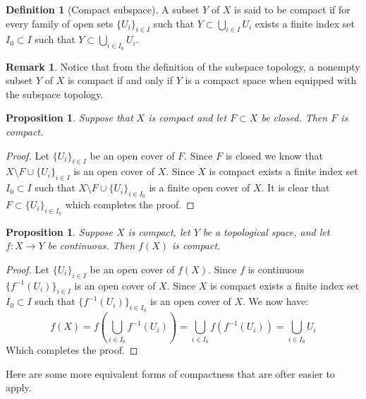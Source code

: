 \documentclass[11pt,a4paper]{article}
\theoremstyle{definition}
\newtheorem{definition}{Definition}[section]
\newtheorem{remark}{Remark}[section]
\theoremstyle{plain}
\newtheorem{proposition}[theorem]{Proposition}
\begin{document}
  \begin{definition}[Compact subspace]
    A subset $Y$ of $X$ is said to be compact if for every family of open
    sets $\{U_i\}_{i \in I}$ such that $Y \subset \bigcup_{i \in I} U_i$
    exists a finite index set $I_0 \subset I$ such that 
    $Y \subset \bigcup_{i \in I_0} U_i$.
  \end{definition}

  \begin{remark}
    Notice that from the definition of the subspace topology,
    a nonempty subset $Y$ of $X$ is compact if and only if $Y$ is a 
    compact space when equipped with the subspace topology.
  \end{remark}

  \begin{proposition}
    Suppose that $X$ is compact and let $F \subset X$ be closed. Then
    $F$ is compact.
  \end{proposition}
  \begin{proof}
    Let $\{U_i\}_{i \in I}$ be an open cover of $F$. Since $F$ is closed
    we know that $X \setminus F \cup \{U_i\}_{i \in I}$ is an open cover
    of $X$. Since $X$ is compact exists a finite index set $I_0 \subset I$
    such that $X \setminus F \cup \{U_i\}_{i \in I_0}$ is a finite
    open cover of $X$. It is clear that $F \subset \{U_i\}_{i \in I_0}$
    which completes the proof.
  \end{proof}

  \begin{proposition}
    Suppose $X$ is compact, let $Y$ be a topological space, and let
    $f \colon X \to Y$ be continuous. Then $f(X)$ is compact.
  \end{proposition}
  \begin{proof}
    Let $\{U_i\}_{i \in I}$ be an open cover of $f(X)$. Since $f$
    is continuous $\{f^{-1}(U_i)\}_{i \in I}$ is an open cover of $X$.
    Since $X$ is compact exists a finite index set $I_0 \subset I$
    such that $\{f^{-1}(U_i)\}_{i \in I_0}$ is an open cover of $X$.
    We now have:
    \[
      f(X) = f\left(\bigcup_{i \in I_0} f^{-1}(U_i)\right) = 
      \bigcup_{i \in I_0} f(f^{-1}(U_i)) = 
      \bigcup_{i \in I_0} U_i
    \]
    Which completes the proof.
  \end{proof}

  Here are some more equivalent forms of compactness that are ofter easier
  to apply.
\end{document}
